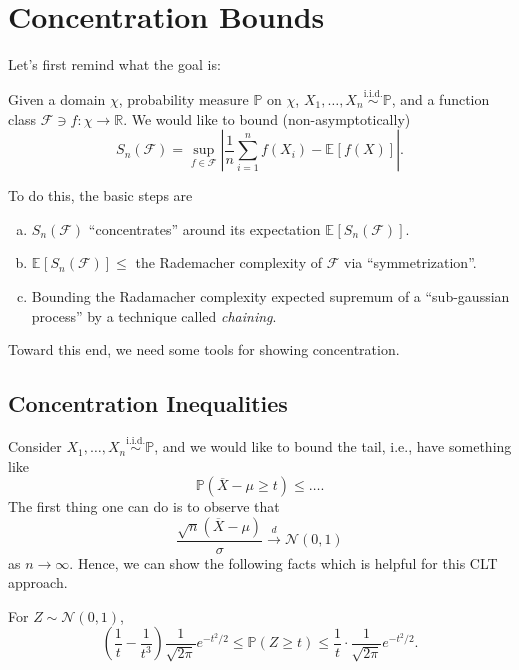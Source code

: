 \chapter{Concentration Bounds}
Let's first remind what the goal is:
\begin{prev}
	Given a domain \(\chi \), probability measure \(\mathbb{P} \) on \(\chi \), \(X_1, \dots , X_n \overset{\text{i.i.d.} }{\sim } \mathbb{P} \), and a function class \(\mathscr{F}\ni f \colon \chi \to \mathbb{R}  \). We would like to bound (non-asymptotically)
	\[
		S_n(\mathscr{F} ) = \sup _{f\in \mathscr{F} } \left\vert \frac{1}{n} \sum_{i=1}^{n} f(X_i) - \mathbb{E}_{}\left[f(X) \right]  \right\vert.
	\]
\end{prev}

To do this, the basic steps are
\begin{enumerate}[(a)]
	\item \(S_n(\mathscr{F} )\) ``concentrates'' around its expectation \(\mathbb{E}_{}\left[S_n(\mathscr{F} ) \right] \).
	\item \(\mathbb{E}_{}\left[S_n(\mathscr{F} ) \right] \leq \) the Rademacher complexity of \(\mathscr{F} \) via ``symmetrization''.
	\item Bounding the Radamacher complexity expected supremum of a ``sub-gaussian process'' by a technique called \emph{chaining}.
\end{enumerate}

Toward this end, we need some tools for showing concentration.

\section{Concentration Inequalities}
Consider \(X_1, \dots , X_n \overset{\text{i.i.d.} }{\sim } \mathbb{P}\), and we would like to bound the tail, i.e., have something like
\[
	\mathbb{P} (\overline{X} - \mu \geq t) \leq  \dots.
\]
The first thing one can do is to observe that
\[
	\frac{\sqrt{n} (\overline{X} - \mu ) }{\sigma } \overset{d}{\to } \mathcal{N} (0, 1)
\]
as \(n \to \infty \). Hence, we can show the following facts which is helpful for this CLT approach.

\begin{proposition}
	For \(Z \sim \mathcal{N} (0, 1)\),
	\[
		\left( \frac{1}{t} - \frac{1}{t^3} \right) \frac{1}{\sqrt{2\pi } } e^{- t^2 / 2} \leq \mathbb{P}(Z \geq t) \leq \frac{1}{t} \cdot \frac{1}{\sqrt{2\pi } } e^{- t^2 / 2}.
	\]
\end{proposition}

